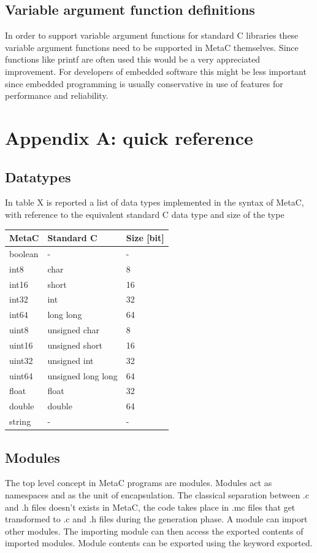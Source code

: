 \documentclass[a4paper,10pt,titlepage]{report}
\begin{document}
\section{Variable argument function definitions}
In order to support variable argument functions for standard C libraries these variable argument functions need to be supported in MetaC themselves. Since functions like printf are often used this would be a very appreciated improvement. For developers of embedded software this might be less important since embedded programming is usually conservative in use of features for performance and reliability.




\appendix
\chapter{Appendix A: quick reference}
\section{Datatypes}
In table X is reported a list of data types implemented in the syntax of MetaC, with reference to the equivalent standard C data type and size of the type

\begin{tabular}{|l|l|l|}
\hline
MetaC & Standard C & Size [bit] \\ \hline
boolean & - & -\\ 
int8 & char & 8 \\ 
int16 & short & 16 \\ 
int32 & int & 32 \\ 
int64 & long long & 64 \\ 
uint8 & unsigned char & 8 \\ 
uint16 & unsigned short & 16 \\ 
uint32 & unsigned int & 32 \\ 
uint64 & unsigned long long & 64 \\ 
float & float & 32 \\ 
double & double & 64 \\ 
string & - & - \\
\hline
\end{tabular}


\section{Modules}
The top level concept in MetaC programs are modules. Modules act as namespaces and as the unit of encapsulation. The classical separation between .c and .h files doesn’t exists in MetaC, the code takes place in .mc files that get transformed to .c and .h files during the generation phase. 
A module can import other modules. The importing module can then access the exported contents of imported modules. Module contents can be exported using the keyword exported.
\end{document}
